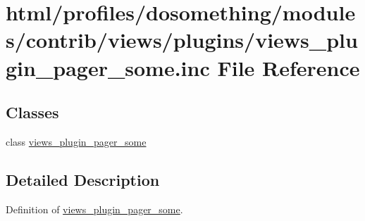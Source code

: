 \hypertarget{views__plugin__pager__some_8inc}{
\section{html/profiles/dosomething/modules/contrib/views/plugins/views\_\-plugin\_\-pager\_\-some.inc File Reference}
\label{views__plugin__pager__some_8inc}
}
\subsection*{Classes}
\begin{DoxyCompactItemize}
\item 
class \hyperlink{classviews__plugin__pager__some}{views\_\-plugin\_\-pager\_\-some}
\end{DoxyCompactItemize}


\subsection{Detailed Description}
Definition of \hyperlink{classviews__plugin__pager__some}{views\_\-plugin\_\-pager\_\-some}. 